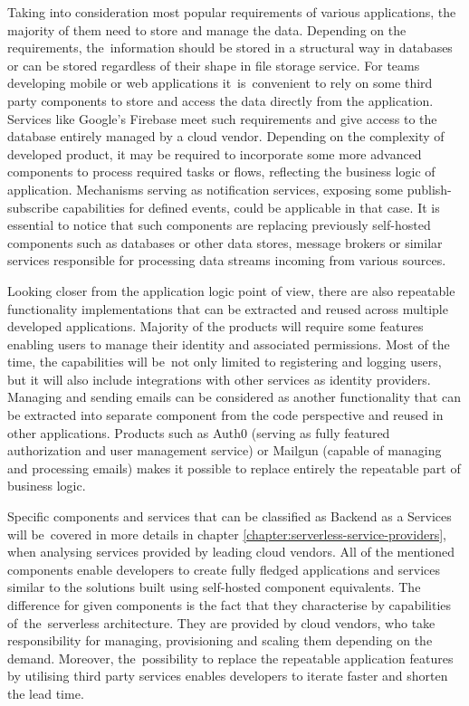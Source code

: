 Taking into consideration most popular requirements of various applications, the majority of them need to store and manage the data. Depending on the requirements, the~information should be stored in a structural way in databases or can be stored regardless of their shape in file storage service. For teams developing mobile or web applications it~is~convenient to rely on some third party components to store and access the data directly from the application. Services like Google's Firebase meet such requirements and give access to the database entirely managed by a cloud vendor. Depending on the complexity of developed product, it may be required to incorporate some more advanced components to process required tasks or flows, reflecting the business logic of application. Mechanisms serving as notification services, exposing some publish-subscribe capabilities for defined events, could be applicable in that case. It is essential to notice that such components are replacing previously self-hosted components such as databases or other data stores, message brokers or similar services responsible for processing data streams incoming from various sources.

Looking closer from the application logic point of view, there are also repeatable functionality implementations that can be extracted and reused across multiple developed applications. Majority of the products will require some features enabling users to manage their identity and associated permissions. Most of the time, the capabilities will be~not only limited to registering and logging users, but it will also include integrations with other services as identity providers. Managing and sending emails can be considered as another functionality that can be extracted into separate component from the code perspective and reused in other applications. Products such as Auth0 (serving as fully featured authorization and user management service) or Mailgun (capable of managing and processing emails) makes it possible to replace entirely the repeatable part of business logic.

Specific components and services that can be classified as Backend as a Services will be~covered in more details in chapter \ref{chapter:serverless-service-providers}, when analysing services provided by leading cloud vendors. All of the mentioned components enable developers to create fully fledged applications and services similar to the solutions built using self-hosted component equivalents. The difference for given components is the fact that they characterise by capabilities of~the~serverless architecture. They are provided by cloud vendors, who take responsibility for managing, provisioning and scaling them depending on the demand. Moreover, the~possibility to replace the repeatable application features by utilising third party services enables developers to iterate faster and shorten the lead time.

